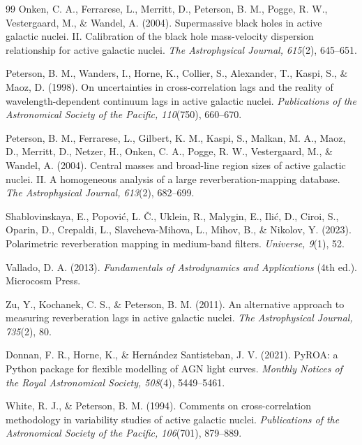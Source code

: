 \documentclass[11pt]{article}
\begin{document}
\begin{thebibliography}{99}
Onken, C. A., Ferrarese, L., Merritt, D., Peterson, B. M., Pogge, R. W., Vestergaard, M., \& Wandel, A. (2004). Supermassive black holes in active galactic nuclei. II. Calibration of the black hole mass-velocity dispersion relationship for active galactic nuclei. \textit{The Astrophysical Journal, 615}(2), 645--651.

Peterson, B. M., Wanders, I., Horne, K., Collier, S., Alexander, T., Kaspi, S., \& Maoz, D. (1998). On uncertainties in cross-correlation lags and the reality of wavelength-dependent continuum lags in active galactic nuclei. \textit{Publications of the Astronomical Society of the Pacific, 110}(750), 660--670.

Peterson, B. M., Ferrarese, L., Gilbert, K. M., Kaspi, S., Malkan, M. A., Maoz, D., Merritt, D., Netzer, H., Onken, C. A., Pogge, R. W., Vestergaard, M., \& Wandel, A. (2004). Central masses and broad-line region sizes of active galactic nuclei. II. A homogeneous analysis of a large reverberation-mapping database. \textit{The Astrophysical Journal, 613}(2), 682--699.

Shablovinskaya, E., Popovi\'{c}, L. \v{C}., Uklein, R., Malygin, E., Ili\'{c}, D., Ciroi, S., Oparin, D., Crepaldi, L., Slavcheva-Mihova, L., Mihov, B., \& Nikolov, Y. (2023). Polarimetric reverberation mapping in medium-band filters. \textit{Universe, 9}(1), 52.

Vallado, D. A. (2013). \textit{Fundamentals of Astrodynamics and Applications} (4th ed.). Microcosm Press.

Zu, Y., Kochanek, C. S., \& Peterson, B. M. (2011). An alternative approach to measuring reverberation lags in active galactic nuclei. \textit{The Astrophysical Journal, 735}(2), 80.

Donnan, F. R., Horne, K., \& Hern\'{a}ndez Santisteban, J. V. (2021). PyROA: a Python package for flexible modelling of AGN light curves. \textit{Monthly Notices of the Royal Astronomical Society, 508}(4), 5449--5461.

White, R. J., \& Peterson, B. M. (1994). Comments on cross-correlation methodology in variability studies of active galactic nuclei. \textit{Publications of the Astronomical Society of the Pacific, 106}(701), 879--889.

\end{thebibliography}
\end{document}
